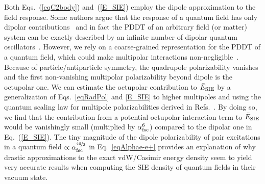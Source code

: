 \documentclass[aps,prl,twocolumn,showpacs,groupaddress]{revtex4-1}
\newcommand{\bbb}[1]{{\color{black}#1}}
\begin{document}
Both Eqs.~(\ref{eqC2body}) and~(\ref{E_SIE}) employ the dipole approximation to the field response. Some authors argue that the response of a quantum field has only dipolar contributions~\cite{Sernelius} and in fact the PDDT of an arbitrary field (or matter) system can be exactly described by an infinite number of dipolar quantum oscillators~\cite{Milonni-book,Jan-ChemRev}. However, we rely on a coarse-grained representation for the PDDT of a quantum field, which could make multipolar interactions non-negligible~\cite{Jan-ChemRev}. Because of particle/antiparticle symmetry, the quadrupole polarizability vanishes and the first non-vanishing multipolar polarizability beyond dipole is the octupolar one. We can estimate the octupolar contribution to $\bar{E}_{\rm{SIE}}$ by a generalization of Eqs.~\eqref{eqRadPol} and \eqref{E_SIE} to higher multipoles and using the quantum scaling law for multipole polarizabilities derived in Refs.~\cite{DimaPRL,OrnellaPRR}. By doing so, we find that the contribution from a potential octupolar interaction term to $\bar{E}_{\rm{SIE}}$ would be vanishingly small (multiplied by $\alpha_{\rm fsc}^6$) compared to the dipolar one in Eq.~(\ref{E_SIE}). The tiny magnitude of the dipole
polarizability of pair excitations in a quantum field
$\propto \alpha_{\rm fsc}^{\nicefrac{46}{3}}$ in Eq.~\eqref{eqAlphae-e+} provides an explanation of why drastic approximations to the exact vdW/Casimir energy density seem
to yield very accurate results when computing the SIE density of quantum fields in their vacuum state.

\end{document}
